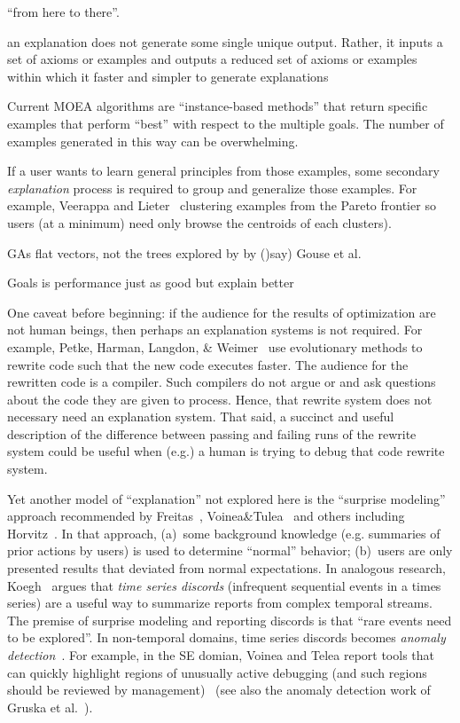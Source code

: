 \documentclass[runningheads]{llncs}
\begin{document}
``from here to there''.

an explanation does not generate some single
unique output. Rather, it inputs a set of axioms or examples and
outputs a reduced set of axioms or examples within which 
it faster and simpler to generate explanations
 
Current MOEA algorithms are ``instance-based methods'' that return
specific examples that perform ``best'' with respect to the multiple goals.
The number of examples generated in this way can be overwhelming.

If a user wants to learn general principles from those examples,
some secondary {\em explanation} process is required to group and generalize those
examples.
For example,  Veerappa and Lieter~\cite{veerappa11} clustering examples from the Pareto
frontier so users (at a minimum) need only browse the centroids of each clusters).



GAs flat vectors, not the trees explored by by ()say) Gouse et al.

Goals is performance just as good but explain better

One caveat before beginning: if the audience for the
results of optimization are not human beings, then
perhaps an explanation systems is not required. For
example, Petke, Harman, Langdon, \&
Weimer~\cite{petke14} use evolutionary methods to
rewrite code such that the new code executes
faster. The audience for the rewritten code is a
compiler. Such compilers do not argue or and ask
questions about the code they are given to process.
Hence, that rewrite system does not necessary need
an explanation system.  That said, a succinct and
useful description of the difference between passing
and failing runs of the rewrite system could be
useful when (e.g.) a human is trying to debug that
code rewrite system.


Yet another model of ``explanation'' not explored
here is the ``surprise modeling'' approach
recommended by 
Freitas~\cite{Freitas98onobjective}, Voinea\&Tulea~\cite{voinea07} and
others including Horvitz~\cite{horvitz05}. In that
approach, (a)~some background knowledge
(e.g. summaries of prior actions by users) is used
to determine ``normal'' behavior; (b)~users are only
presented results that deviated from normal
expectations. In analogous research,
Koegh~\cite{keogh05} argues that {\em time series
  discords} (infrequent sequential events in a times
series) are a useful way to summarize reports from
complex temporal streams. The premise of surprise
modeling and reporting discords is that ``rare
events need to be explored''.  
In non-temporal domains, time series discords becomes
{\em anomaly detection}~\cite{chandola09}. For example, in the SE domian,
Voinea and Telea report tools that can quickly highlight regions
of unusually active debugging (and such regions should be reviewed
by management)~\cite{voiena07} (see also the anomaly
detection work of Gruska et al.~\cite{gruska10}).
\end{document}
